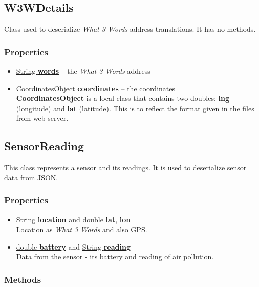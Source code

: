 \documentclass{article}
\begin{document}
\subsection{W3WDetails}
\label{cls:W3WDetails}

Class used to deserialize \textit{What 3 Words} address translations. It has no methods.

\subsubsection*{Properties}

\begin{itemize}
\item \underline{String \textbf{words}} -- the \textit{What 3 Words} address
\item \underline{CoordinatesObject \textbf{coordinates}} -- the coordinates \\
  \textbf{CoordinatesObject} is a local class that contains two doubles: \textbf{lng} (longitude) and \textbf{lat} (latitude). This is to reflect the format given in the files from web server.
\end{itemize}


\subsection{SensorReading}
\label{cls:SensorReading}

This class represents a sensor and its readings. It is used to deserialize sensor data from JSON.

\subsubsection*{Properties}

\begin{itemize}
\item \underline{String \textbf{location}} and \underline{double \textbf{lat}, \textbf{lon}} \\
  Location as \textit{What 3 Words} and also GPS.
\item \underline{double \textbf{battery}} and \underline{String \textbf{reading}} \\
  Data from the sensor - its battery and reading of air pollution.
\end{itemize}

\subsubsection*{Methods}
\end{document}
